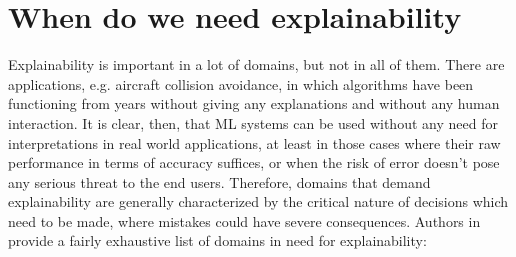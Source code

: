 

\section{When do we need explainability}
Explainability is important in a lot of domains, but not in all of them. There are applications, e.g. aircraft collision avoidance, in which algorithms have been functioning from years without giving any explanations and without any human interaction. It is clear, then, that ML systems can be used without any need for interpretations in real world applications, at least in those cases where their raw performance in terms of accuracy suffices, or when the risk of error doesn't pose any serious threat to the end users. Therefore, domains that demand explainability are generally characterized by the critical nature of decisions which need to be made, where mistakes could have severe consequences. Authors in \cite{burkart2021survey} provide a fairly exhaustive list of domains in need for explainability:
